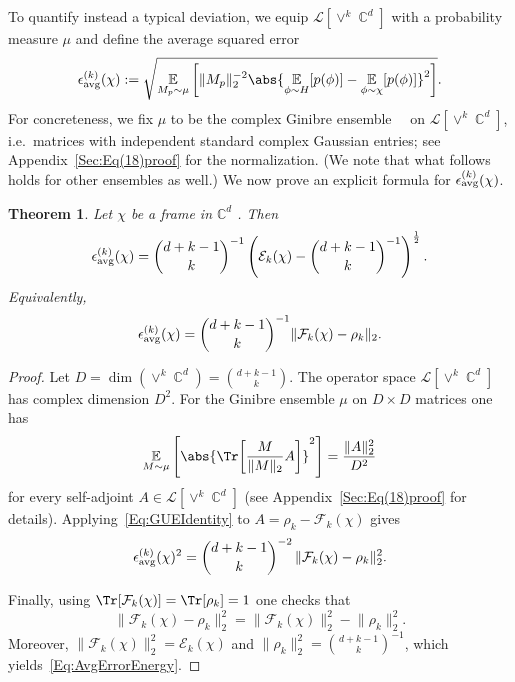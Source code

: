 \documentclass[aps,twocolumn,pra,superscriptaddress,nofootinbib]{revtex4-2}
\newtheorem{thm}{Theorem}
\DeclareMathOperator{\C}{\mathbb{C}} %
\begin{document}
To quantify instead a typical deviation, we equip $\mathcal L[\vee^k\C^d]$ with  a probability measure $\mu$
and define the average squared error
\begin{equation}\label{Eq:epsAvgDef}
  \epsilon_{\rm{avg}}^{(k)}(\chi):=
  \sqrt{
  \underset{M_{p}\sim \mu}{\mathbb{E}}
  \left[
    \lVert M_{p}\rVert_{2}^{-2}
    \abs{
      \underset{\phi\sim H}{\mathbb{E}}[p(\phi)]
      -\underset{\phi\sim \chi}{\mathbb{E}}[p(\phi)]
    }^{2}
  \right]}.
\end{equation}
For concreteness, we fix $\mu$ to be the {complex} Ginibre ensemble~\cite{Ginibre1965}{~\cite{byun2023progressstudyginibreensembles}} on $\mathcal L[\vee^k\C^d]$, {i.e.\ matrices with independent standard complex Gaussian entries}; see Appendix~\ref{Sec:Eq(18)proof} for the normalization. (We note that {what follows holds for other ensembles as well}.)
We now prove an explicit formula for $\epsilon_{\rm{avg}}^{(k)}(\chi)$.

\begin{thm}\label{Th:AvgErrorExplicit}
Let $\chi$ be a frame in $\mathbb{C}^{d}$ . Then
\begin{equation}\label{Eq:AvgErrorEnergy}
   \epsilon_{\rm{avg}}^{(k)}(\chi)=
   \binom{d+k-1}{k}^{{-1}}
   \left(\mathcal{E}_{k}(\chi)-\binom{d+k-1}{k}^{-1}\right)^{\frac{1}{2}}.
\end{equation}
Equivalently,
\begin{equation}\label{Eq:AvgErrorFrob}
   \epsilon_{\rm{avg}}^{(k)}(\chi)=
   \binom{d+k-1}{k}^{{-1}}
   \lVert \mathcal{F}_{k}(\chi)-\rho_{k} \rVert_{2}.
\end{equation}
\end{thm}

\begin{proof}
Let $D=\dim(\vee^k\C^d)=\binom{d+k-1}{k}$. {The operator space $\mathcal L[\vee^k\C^d]$ has complex dimension $D^2$.}
For the Ginibre ensemble $\mu$ on $D\times D$ matrices one has
\begin{equation}\label{Eq:GUEIdentity}
  \underset{M\sim \mu}{\mathbb{E}}
  \left[
    \abs{\Tr\!\left[\frac{M}{\lVert M\rVert_{2}}A\right]}^{2}
  \right]
  =\frac{\lVert A\rVert_{2}^{2}}{{D^2}}
\end{equation}
for every self-adjoint $A\in\mathcal L[\vee^k\C^d]$ (see Appendix~\ref{Sec:Eq(18)proof} for details).
Applying~\eqref{Eq:GUEIdentity} to $A=\rho_k-\mathcal F_k(\chi)$ gives
\[
\epsilon_{\rm{avg}}^{(k)}(\chi)^2
=\binom{d+k-1}{k}^{{-2}}\,\lVert \mathcal F_k(\chi)-\rho_k\rVert_2^2.
\]

Finally, using $\Tr[\mathcal F_k(\chi)]=\Tr[\rho_k]=1$ one checks that
\[
\lVert \mathcal F_k(\chi)-\rho_k\rVert_2^2
=\lVert \mathcal F_k(\chi)\rVert_2^2-\lVert \rho_k\rVert_2^2.
\]
Moreover, $\lVert\mathcal F_k(\chi)\rVert_2^2=\mathcal E_k(\chi)$ and
$\lVert\rho_k\rVert_2^2=\binom{d+k-1}{k}^{-1}$, which yields~\eqref{Eq:AvgErrorEnergy}.
\end{proof}
\end{document}
